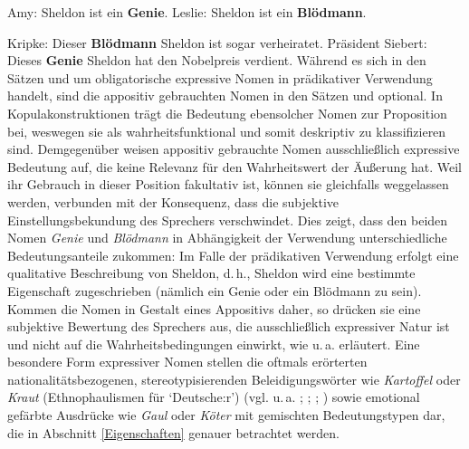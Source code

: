 \ea  \label{ExNom}
\ea Amy: \glqq{}Sheldon ist ein \textbf{Genie}.\grqq{} \label{amy2}
\ex Leslie: \glqq{}Sheldon ist ein \textbf{Blödmann}.\grqq{} \label{leslie}
 \z
 \z

\ea  \label{ExNoma}
\ea Kripke: \glqq{}Dieser \textbf{Blödmann} Sheldon ist sogar verheiratet.\grqq{} \label{kripke4}
\ex Präsident Siebert: \glqq{}Dieses \textbf{Genie} Sheldon hat den Nobelpreis verdient.\grqq{} \label{siebert}
 \z
 \z
Während es sich in den Sätzen  und  um obligatorische expressive Nomen in prädikativer Verwendung handelt, sind die appositiv gebrauchten Nomen in den Sätzen  und  optional. In Kopulakonstruktionen trägt die Bedeutung ebensolcher Nomen zur Proposition bei, weswegen sie als wahrheitsfunktional und somit deskriptiv zu klassifizieren sind. Demgegenüber weisen appositiv gebrauchte Nomen ausschließlich expressive Bedeutung auf, die keine Relevanz für den Wahrheitswert der Äußerung hat. Weil ihr Gebrauch in dieser Position fakultativ ist, können sie gleichfalls weggelassen werden, verbunden mit der Konsequenz, dass die subjektive Einstellungsbekundung des Sprechers verschwindet. Dies zeigt, dass den beiden Nomen \textit{Genie} und \textit{Blödmann} in Abhängigkeit der Verwendung unterschiedliche Bedeutungsanteile zukommen: Im Falle der prädikativen Verwendung erfolgt eine qualitative Beschreibung von Sheldon, d.\,h., Sheldon wird eine bestimmte Eigenschaft zugeschrieben (nämlich ein Genie oder ein Blödmann zu sein). Kommen die Nomen in Gestalt eines Appositivs daher, so drücken sie eine subjektive Bewertung des Sprechers aus, die ausschließlich expressiver Natur ist und nicht auf die Wahrheitsbedingungen einwirkt, wie u.\,a. \citet[270]{Gutzmann.2015a} erläutert. Eine besondere Form expressiver Nomen stellen die oftmals erörterten nationalitätsbezogenen, stereotypisierenden Beleidigungswörter wie \textit{Kartoffel} oder \textit{Kraut} (Ethnophaulismen für `Deutsche:r') (vgl. u.\,a. \citealt[2]{McCready.2010}; {\citealt[]{Croom.2013,Croom.2015}}; \citealt[20]{Gutzmann.2015a}; {\citealt[40]{Technau.2018}}) sowie emotional gefärbte Ausdrücke wie \textit{Gaul} oder \textit{Köter} mit gemischten Bedeutungstypen dar, die in Abschnitt \ref{Eigenschaften} genauer betrachtet werden.


